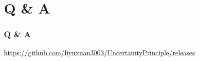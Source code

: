 \section{Q \& A}

\begin{frame}
    \frametitle{Q \& A}

    \url{https://github.com/liyuxuan3003/UncertaintyPrinciple/releases}
\end{frame}